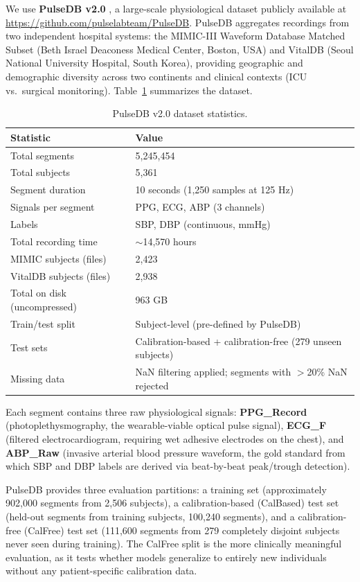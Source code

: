 \documentclass[11pt]{article}
\begin{document}
We use \textbf{PulseDB v2.0} \citep{wang2023pulsedb}, a large-scale physiological dataset publicly available at \url{https://github.com/pulselabteam/PulseDB}. PulseDB aggregates recordings from two independent hospital systems: the MIMIC-III Waveform Database Matched Subset (Beth Israel Deaconess Medical Center, Boston, USA) and VitalDB (Seoul National University Hospital, South Korea), providing geographic and demographic diversity across two continents and clinical contexts (ICU vs.\ surgical monitoring). Table~\ref{tab:dataset} summarizes the dataset.

\begin{table}[ht!]
\centering
\begin{tabular}{@{}ll@{}}
\toprule
\textbf{Statistic} & \textbf{Value} \\
\midrule
Total segments & 5,245,454 \\
Total subjects & 5,361 \\
Segment duration & 10 seconds (1,250 samples at 125 Hz) \\
Signals per segment & PPG, ECG, ABP (3 channels) \\
Labels & SBP, DBP (continuous, mmHg) \\
Total recording time & $\sim$14,570 hours \\
MIMIC subjects (files) & 2,423 \\
VitalDB subjects (files) & 2,938 \\
Total on disk (uncompressed) & 963 GB \\
Train/test split & Subject-level (pre-defined by PulseDB) \\
Test sets & Calibration-based + calibration-free (279 unseen subjects) \\
Missing data & NaN filtering applied; segments with $>$20\% NaN rejected \\
\bottomrule
\end{tabular}
\caption{PulseDB v2.0 dataset statistics.}
\label{tab:dataset}
\end{table}

Each segment contains three raw physiological signals: \textbf{PPG\_Record} (photoplethysmography, the wearable-viable optical pulse signal), \textbf{ECG\_F} (filtered electrocardiogram, requiring wet adhesive electrodes on the chest), and \textbf{ABP\_Raw} (invasive arterial blood pressure waveform, the gold standard from which SBP and DBP labels are derived via beat-by-beat peak/trough detection).

PulseDB provides three evaluation partitions: a training set (approximately 902,000 segments from 2,506 subjects), a calibration-based (CalBased) test set (held-out segments from training subjects, 100,240 segments), and a calibration-free (CalFree) test set (111,600 segments from 279 completely disjoint subjects never seen during training). The CalFree split is the more clinically meaningful evaluation, as it tests whether models generalize to entirely new individuals without any patient-specific calibration data.
\end{document}
